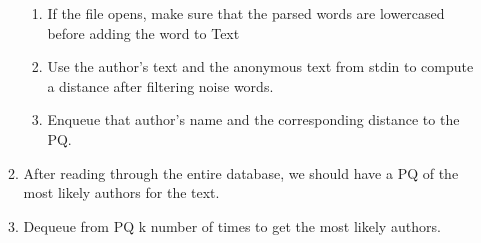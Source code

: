 \documentclass[11pt]{article}
\begin{document}
\begin{enumerate}
\begin{enumerate}
\begin{enumerate}
		\item If the file opens, make sure that the parsed words are lowercased before adding the word to Text
		\item Use the author's text and the anonymous text from stdin to compute a distance after filtering noise words.
		\item Enqueue that author's name and the corresponding distance to the PQ.
		\end{enumerate}
	\item After reading through the entire database, we should have a PQ of the most likely authors for the text.
	\item Dequeue from PQ k number of times to get the most likely authors.
	\end{enumerate}
\end{enumerate}
\end{document}
